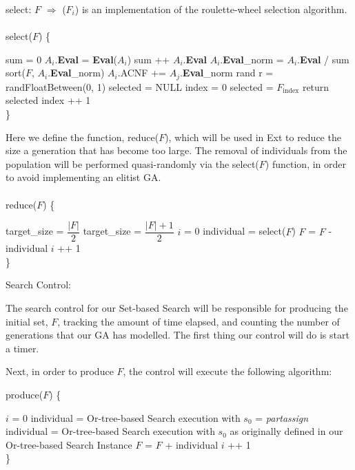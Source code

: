 \documentclass[11pt, oneside]{article}   	%
\begin{document}
\noindent select: $F$ $\Rightarrow$ ($F_i$) is an implementation of the roulette-wheel selection algorithm.\\\\
select($F$) \{
\begin{algorithmic}[\textfloatsep = 0pt]
    \STATE sum = 0
    	\STATE $A_i$.\textbf{Eval} = \textbf{Eval}($A_i$)
	\STATE sum ++ $A_i$.\textbf{Eval}
    \ENDFOR
    	\STATE $A_i$.\textbf{Eval}_norm = $A_i$.\textbf{Eval} / sum
    \ENDFOR
    \STATE sort($F$, $A_i$.\textbf{Eval}_norm)
    		\STATE $A_i$.ACNF += $A_j$.\textbf{Eval}_norm
    	\ENDFOR
    \ENDFOR
    \STATE rand r = randFloatBetween(0, 1)
    \STATE selected = NULL
    \STATE index = 0
    	\STATE selected = $F_{\text{index}}$
    		\STATE return selected
    	\ENDIF
	\STATE index ++ 1
    \ENDWHILE \\ \}
\end{algorithmic}

\noindent Here we define the function, reduce($F$), which will be used in Ext to reduce the size a generation that has become too large. The removal of individuals from the population will be performed quasi-randomly via the select($F$) function, in order to avoid implementing an elitist GA.\\\\
reduce($F$) \{
\begin{algorithmic}[\textfloatsep = 0pt]
    	\STATE target_size = $\dfrac{\vert F \vert}{2}$
    \ELSE
    	\STATE target_size = $\dfrac{\vert F \vert + 1}{2}$
    \ENDIF
    \STATE $i$ = 0
    	\STATE individual = select($F$)
	\STATE $F$ = $F$ - individual
	\STATE $i$ ++ 1
    \ENDWHILE \\ \}
\end{algorithmic}

\noindent Search Control:

\noindent The search control for our Set-based Search will be responsible for producing the initial set, $F$, tracking the amount of time elapsed, and counting the number of generations that our GA has modelled. The first thing our control will do is start a timer.

\noindent Next, in order to produce $F$, the control will execute the following algorithm:

\noindent produce($F$) \{
\begin{algorithmic}[\textfloatsep = 0pt]
    \STATE $i$ = 0
		\STATE individual = Or-tree-based Search execution with $s_0$ = \textit{partassign}
	\ELSE
		\STATE individual = Or-tree-based Search execution with $s_0$ as originally defined in our Or-tree-based Search Instance
	\ENDIF
	\STATE $F$ = $F$ + individual
	\STATE $i$ ++ 1
    \ENDWHILE \\ \}
\end{algorithmic}
\end{document}
